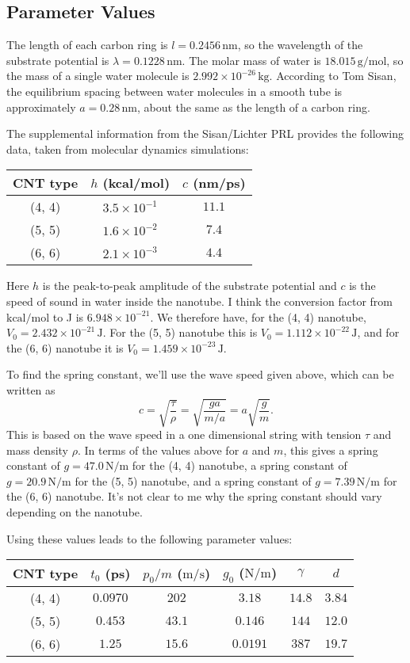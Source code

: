 \documentclass[11pt]{article}
\begin{document}
\subsection{Parameter Values}

The length of each carbon ring is $l=0.2456\,\text{nm}$, so the wavelength of the substrate potential is $\lambda=0.1228\,\text{nm}$. The molar mass of water is $18.015\,\text{g/mol}$, so the mass of a single water molecule is $2.992\times10^{-26}\,\text{kg}$. According to Tom Sisan, the equilibrium spacing between water molecules in a smooth tube is approximately $a=0.28\,\text{nm}$, about the same as the length of a carbon ring.

The supplemental information from the Sisan/Lichter PRL provides the following data, taken from molecular dynamics simulations:
\begin{center}
\begin{tabular}{ccc}
CNT type & $h$ (kcal/mol) & $c$ (nm/ps) \\\hline
(4, 4) & $3.5\times10^{-1}$ & $11.1$ \\
(5, 5) & $1.6\times10^{-2}$ & $7.4$ \\
(6, 6) & $2.1\times10^{-3}$ & $4.4$
\end{tabular}
\end{center}

Here $h$ is the peak-to-peak amplitude of the substrate potential and $c$ is the speed of sound in water inside the nanotube. I think the conversion factor from $\text{kcal}/\text{mol}$ to J is $6.948\times10^{-21}$. We therefore have, for the (4, 4) nanotube, $V_0=2.432\times10^{-21}\,\text{J}$. For the (5, 5) nanotube this is $V_0=1.112\times10^{-22}\,\text{J}$, and for the (6, 6) nanotube it is $V_0=1.459\times10^{-23}\,\text{J}$.

To find the spring constant, we'll use the wave speed given above, which can be written as
\[
c = \sqrt{\frac{\tau}{\rho}}=\sqrt{\frac{ga}{m/a}}=a\sqrt{\frac{g}{m}}.
\]
This is based on the wave speed in a one dimensional string with tension $\tau$ and mass density $\rho$. In terms of the values above for $a$ and $m$, this gives a spring constant of $g=47.0\,\text{N}/\text{m}$ for the (4, 4) nanotube, a spring constant of $g=20.9\,\text{N}/\text{m}$ for the (5, 5) nanotube, and a spring constant of $g=7.39\,\text{N}/\text{m}$ for the (6, 6) nanotube. It's not clear to me why the spring constant should vary depending on the nanotube.

Using these values leads to the following parameter values:
\begin{center}
\begin{tabular}{cccccc}
CNT type & $t_0$ (ps) & $p_0/m$ ($\text{m}/\text{s}$) & $g_0$ ($\text{N}/\text{m}$) & $\gamma$ & $d$ \\\hline
(4, 4) & $0.0970$ & $202$ & $3.18$ & $14.8$ & $3.84$ \\
(5, 5) & $0.453$ & $43.1$ & $0.146$ & $144$ & $12.0$ \\
(6, 6) & $1.25$ & $15.6$ & $0.0191$ & $387$ & $19.7$
\end{tabular}
\end{center}
\end{document}
